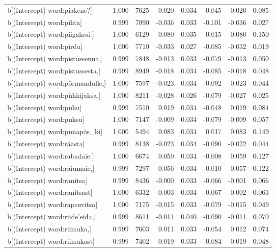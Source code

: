\begin{longtable}{lrrrrrrr}
  b[(Intercept) word:piakene?] & 1.000 & 7625 & 0.020 & 0.034 & -0.045 & 0.020 & 0.085 \\ 
  b[(Intercept) word:pihta] & 0.999 & 7090 & -0.036 & 0.033 & -0.101 & -0.036 & 0.027 \\ 
  b[(Intercept) word:piigakesi.] & 1.000 & 6129 & 0.080 & 0.035 & 0.015 & 0.080 & 0.150 \\ 
  b[(Intercept) word:pirdu] & 1.000 & 7710 & -0.033 & 0.027 & -0.085 & -0.032 & 0.019 \\ 
  b[(Intercept) word:pistussenna,] & 0.999 & 7848 & -0.013 & 0.033 & -0.079 & -0.013 & 0.050 \\ 
  b[(Intercept) word:pistussesta,] & 0.999 & 8949 & -0.018 & 0.034 & -0.085 & -0.018 & 0.048 \\ 
  b[(Intercept) word:põrmandulle,] & 1.000 & 7597 & -0.023 & 0.034 & -0.092 & -0.023 & 0.044 \\ 
  b[(Intercept) word:pühkijaksa,] & 1.000 & 8211 & -0.028 & 0.026 & -0.079 & -0.027 & 0.025 \\ 
  b[(Intercept) word:puhu] & 0.999 & 7510 & 0.019 & 0.034 & -0.048 & 0.019 & 0.084 \\ 
  b[(Intercept) word:puksu] & 1.000 & 7147 & -0.009 & 0.034 & -0.079 & -0.009 & 0.057 \\ 
  b[(Intercept) word:punapõs\_ki] & 1.000 & 5494 & 0.083 & 0.034 & 0.017 & 0.083 & 0.149 \\ 
  b[(Intercept) word:räästa] & 0.999 & 8138 & -0.023 & 0.034 & -0.090 & -0.022 & 0.044 \\ 
  b[(Intercept) word:rabadaie.] & 1.000 & 6674 & 0.059 & 0.034 & -0.008 & 0.059 & 0.127 \\ 
  b[(Intercept) word:raiumaie,] & 0.999 & 7297 & 0.056 & 0.034 & -0.010 & 0.057 & 0.122 \\ 
  b[(Intercept) word:ranitsa] & 0.999 & 8436 & -0.000 & 0.033 & -0.066 & -0.001 & 0.066 \\ 
  b[(Intercept) word:ranitsast] & 1.000 & 6332 & -0.003 & 0.034 & -0.067 & -0.002 & 0.063 \\ 
  b[(Intercept) word:rapsuvitsa] & 1.000 & 7175 & -0.015 & 0.033 & -0.079 & -0.015 & 0.049 \\ 
  b[(Intercept) word:riide'eida,] & 0.999 & 8611 & -0.011 & 0.040 & -0.090 & -0.011 & 0.070 \\ 
  b[(Intercept) word:riimuka,] & 0.999 & 7603 & 0.011 & 0.033 & -0.054 & 0.012 & 0.074 \\ 
  b[(Intercept) word:riimukast] & 0.999 & 7402 & -0.019 & 0.033 & -0.084 & -0.019 & 0.048 \\ 

\end{longtable}
